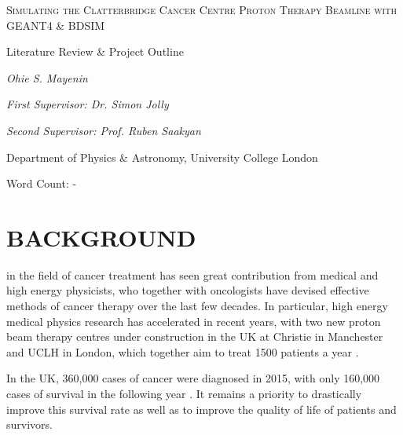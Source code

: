 \documentclass[a4paper, 12pt, conference]
{ieeeconf}      %
\begin{document}
\begin{titlepage}
	\centering
     
	{\scshape\Huge Simulating the Clatterbridge Cancer Centre Proton Therapy Beamline with GEANT4 \& BDSIM \par}
	\vspace{0.5cm}
	{\scshape\Large{Literature Review \& Project Outline\par}}
	\vspace{1cm}
	{\large\itshape Ohie S. Mayenin\par}
    \vspace{1cm}
    {\itshape First Supervisor: Dr. Simon Jolly\par}
    {\itshape Second Supervisor: Prof. Ruben Saakyan\par}
    \vspace{0.5cm}
    {Department of Physics \& Astronomy, University College London\par}
	\vspace{1cm}
    \vfill
	Word Count: -
	\vfill
\end{titlepage}





\section{BACKGROUND}

 in the field of cancer treatment has seen great contribution from medical and high energy physicists, who together with oncologists have devised effective methods of cancer therapy over the last few decades. In particular, high energy medical physics research has accelerated in recent years, with two new proton beam therapy centres under construction in the UK at Christie in Manchester and UCLH in London, which together aim to treat 1500 patients a year \cite{hep}. 

In the UK, 360,000 cases of cancer were diagnosed in 2015, with only 160,000 cases of survival in the following year \cite{cancerstatistics}. It remains a priority to drastically improve this survival rate as well as to improve the quality of life of patients and survivors.
\end{document}
